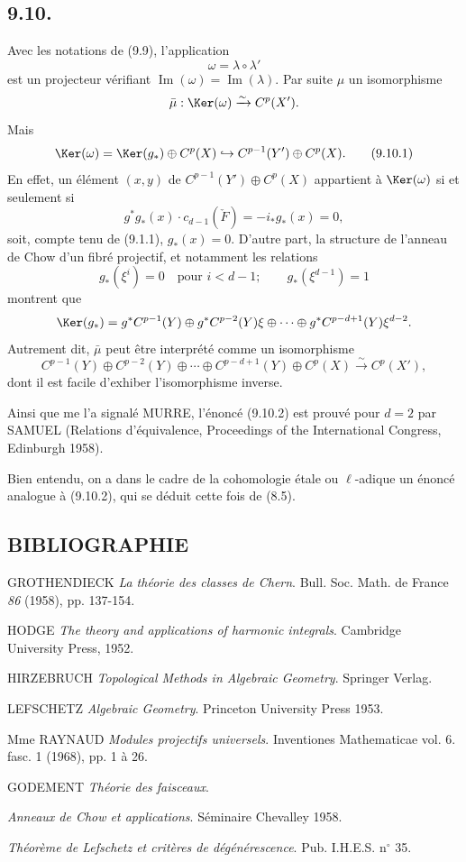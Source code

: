 \subsection*{9.10.}

Avec les notations de (9.9), l'application
\[
\omega=\lambda\circ\lambda'
\]
est un projecteur vérifiant $\operatorname{Im}(\omega)=\operatorname{Im}(\lambda)$. Par suite $\mu$  un isomorphisme
\[
\bar\mu:\Ker(\omega)\xrightarrow{\sim}C^p(X').
\]
Mais
\[
\Ker(\omega)=\Ker(g_*)\oplus C^p(X)\hookrightarrow C^{p-1}(Y')\oplus C^p(X).
\tag{9.10.1}
\]
En effet, un élément $(x,y)$ de $C^{p-1}(Y')\oplus C^p(X)$ appartient à $\Ker(\omega)$ si et seulement si
\[
g^*g_*(x)\cdot c_{d-1}(\check F)=-i_*g_*(x)=0,
\]
soit, compte tenu de (9.1.1), $g_*(x)=0$. D'autre part, la structure de l'anneau de Chow d'un fibré projectif, et notamment les relations
\[
g_*(\xi^i)=0\quad\text{pour }i<d-1;\qquad g_*(\xi^{d-1})=1
\]
montrent que
\[
\Ker(g_*)=g^*C^{p-1}(Y)\oplus g^*C^{p-2}(Y)\xi\oplus\cdots\oplus g^*C^{p-d+1}(Y)\xi^{d-2}.
\]
Autrement dit, $\bar\mu$ peut être interprété comme un isomorphisme
\[
C^{p-1}(Y)\oplus C^{p-2}(Y)\oplus\cdots\oplus C^{p-d+1}(Y)\oplus C^p(X)
\xrightarrow{\sim}C^p(X'),
\tag{9.10.2}
\]
dont il est facile d'exhiber l'isomorphisme inverse.

Ainsi que me l'a signalé MURRE, l'énoncé (9.10.2) est prouvé pour $d=2$ par SAMUEL (Relations d'équivalence, Proceedings of the International Congress, Edinburgh 1958).

Bien entendu, on a dans le cadre de la cohomologie étale ou $\ell$-adique un énoncé analogue à (9.10.2), qui se déduit cette fois de (8.5).

\subsection*{BIBLIOGRAPHIE}

\begin{enumerate}[label={[\arabic*]}]
\item GROTHENDIECK \emph{La théorie des classes de Chern}. Bull. Soc. Math. de France \emph{86} (1958), pp. 137-154.
\item HODGE \emph{The theory and applications of harmonic integrals}. Cambridge University Press, 1952.
\item HIRZEBRUCH \emph{Topological Methods in Algebraic Geometry}. Springer Verlag.
\item LEFSCHETZ \emph{Algebraic Geometry}. Princeton University Press 1953.
\item Mme RAYNAUD \emph{Modules projectifs universels}. Inventiones Mathematicae vol. 6. fasc. 1 (1968), pp. 1 à 26.
\item[{[TF]}] GODEMENT \emph{Théorie des faisceaux}.
\item[{[CH]}] \emph{Anneaux de Chow et applications}. Séminaire Chevalley 1958.
\item[{[6]}] \emph{Théorème de Lefschetz et critères de dégénérescence}. Pub. I.H.E.S. n$^\circ$ 35.
\end{enumerate}


